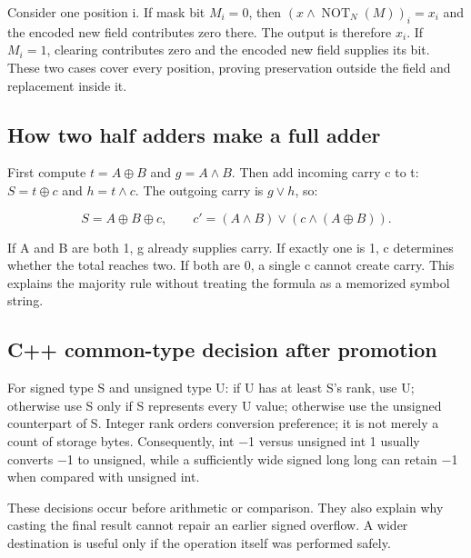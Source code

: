 Consider one position i. If mask bit \(M_i=0\), then \((x\land\operatorname{NOT}_N(M))_i=x_i\) and the encoded new field contributes zero there. The output is therefore \(x_i\). If \(M_i=1\), clearing contributes zero and the encoded new field supplies its bit. These two cases cover every position, proving preservation outside the field and replacement inside it.

\subsection{How two half adders make a full adder}\label{03-visual-computing-i-ch018-how-two-half-adders-make-a-full-adder}

\hypertarget{03-visual-computing-i-ch018-how-two-half-adders-make-a-full-adder}{}

First compute \(t=A\oplus B\) and \(g=A\land B\). Then add incoming carry c to t: \(S=t\oplus c\) and \(h=t\land c\). The outgoing carry is \(g\lor h\), so:

\[
S=A\oplus B\oplus c,\qquad c'=(A\land B)\lor(c\land(A\oplus B)).
\]

If A and B are both 1, g already supplies carry. If exactly one is 1, c determines whether the total reaches two. If both are 0, a single c cannot create carry. This explains the majority rule without treating the formula as a memorized symbol string.

\subsection{C++ common-type decision after promotion}\label{03-visual-computing-i-ch018-c-common-type-decision-after-promotion}

\hypertarget{03-visual-computing-i-ch018-c-common-type-decision-after-promotion}{}

For signed type S and unsigned type U: if U has at least S's rank, use U; otherwise use S only if S represents every U value; otherwise use the unsigned counterpart of S. Integer rank orders conversion preference; it is not merely a count of storage bytes. Consequently, int −1 versus unsigned int 1 usually converts −1 to unsigned, while a sufficiently wide signed long long can retain −1 when compared with unsigned int.

These decisions occur before arithmetic or comparison. They also explain why casting the final result cannot repair an earlier signed overflow. A wider destination is useful only if the operation itself was performed safely.

